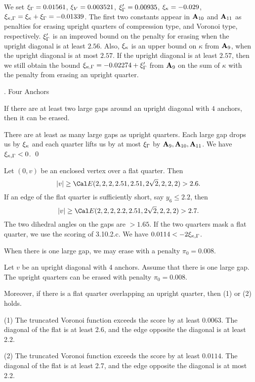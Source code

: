 We set $\xi_\Gamma = 0.01561$, $\xi_V = 0.003521$, $\xi_\Gamma'=0.00935$,
$\xi_\kappa=-0.029$,
$\xi_{\kappa,\Gamma} = \xi_\kappa+\xi_\Gamma = -0.01339$.
The first two constants appear in ${\bold A}_{10}$ and ${\bold A}_{11}$ as penalties
for erasing upright quarters of compression type, and Voronoi type,
respectively. 
$\xi_\Gamma'$ is an improved bound on the penalty for erasing when
the upright diagonal is at least $2.56$.
Also, $\xi_\kappa$ is an upper bound on $\kappa$ from ${\bold A}_9$, when
the upright diagonal is at most $2.57$.  If the upright
diagonal is at least $2.57$, then we still obtain the bound
$\xi_{\kappa,\Gamma} = -0.02274+\xi_\Gamma'$ from ${\bold A}_9$ on the sum of $\kappa$ with
the penalty from erasing an upright quarter.



\subhead {}.  Four Anchors\endsubhead

If there are at least two large gaps around an upright diagonal
with $4$ anchors, then it can be erased.
\endproclaim

There are at least as many large gaps as upright quarters.
Each large gap drops us by $\xi_\kappa$ and each quarter
lifts us by at most $\xi_\Gamma$ by ${\bold A}_9,{\bold A}_{10},{\bold A}_{11}$.  
We have $\xi_{\kappa,\Gamma}<0$. 
\qed
\enddemo
\smallskip

 Let $(0,v)$ be an enclosed vertex over a flat quarter.
Then $$|v|\ge\Cal E(2,2,2,2.51,2.51,2\sqrt2,2,2,2)>2.6.$$  If an
edge of the flat quarter is sufficiently short, say $y_6\le2.2$, then
$$|v|\ge\Cal E(2,2,2,2.2,2.51,2\sqrt2,2,2,2)>2.7.$$
The two dihedral angles on the gaps are $>1.65$.  If the two
quarters mask a flat quarter, we use the scoring of 3.10.2.c.  
We have $0.0114< -2\xi_{\kappa,\Gamma}$.
\endproclaim

\smallskip
When there is one large gap, we may erase with a penalty $\pi_0=0.008$.

Let $v$ be an upright diagonal with 4 anchors.  Assume that there is
one large gap.  The upright quarters can be erased with penalty $\pi_0=0.008$.

Moreover, if there is a flat quarter 
overlapping an upright quarter, then (1) or
(2) holds.

(1)  The truncated Voronoi function exceeds the score by at least
$0.0063$.  The diagonal of the flat is at least 2.6, and the edge
opposite the diagonal is at least 2.2.


(2)  The truncated Voronoi function exceeds the score by at least
$0.0114$.  The diagonal of the flat is at least 2.7, and the edge
opposite the diagonal is at most 2.2.
\endproclaim

